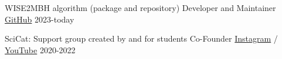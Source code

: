 
\begin{cventries}
  \cventry
    {WISE2MBH algorithm (package and repository)}
    {Developer and Maintainer}
    {\href{https://github.com/joacoh/wise2mbh}{GitHub}}
    {2023-today}
    {}

  \cventry
    {SciCat: Support group created by and for students}
    {Co-Founder}
    {\href{https://www.instagram.com/scicat.cl/}{Instagram} /
     \href{https://www.youtube.com/channel/UC4y3QUrci4jNY9kQ2tiS67A}{YouTube}}
    {2020-2022}
    {}
    
\end{cventries}
